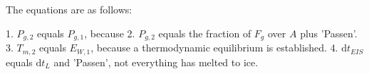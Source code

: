 The equations are as follows:

1. \( P_{g,2} \) equals \( P_{g,1} \), because
2. \( P_{g,2} \) equals the fraction of \( F_g \) over \( A \) plus 'Passen'.
3. \( T_{m,2} \) equals \( E_{W,1} \), because a thermodynamic equilibrium is established.
4. \( \text{d}t_{EIS} \) equals \( \text{d}t_{L} \) and 'Passen', not everything has melted to ice.